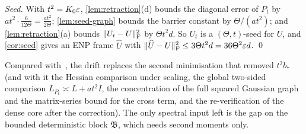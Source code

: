 \emph{Seed.} With $t^2=K_0\varepsilon$, \cref{lem:retraction}(d) bounds the diagonal
error of $P_t$ by $at^2\cdot\frac6{12\Theta}=\frac{at^2}{2\Theta}$;
\cref{lem:seed-graph} bounds the barrier constant by $\Theta/(at^2)$; and
\cref{lem:retraction}(a) bounds $\lVert U_t-U\rVert_{\mathrm F}^2$ by $\Theta t^2d$. So $U_t$ is a
$(\Theta,t)$-seed for $U$, and \cref{cor:seed} gives an ENP frame $\widehat U$
with $\lVert \widehat U-U\rVert_{\mathrm F}^2\le3\Theta t^2d=36\Theta^2\varepsilon d$.
\qed

\begin{remark}
Compared with~\cite{Orig}, the drift replaces the second minimisation that
removed $t^2b_*$ (and with it the Hessian comparison under scaling, the global
two-sided comparison $L_{P_t}\asymp L+at^2I$, the concentration of the full
squared Gaussian graph and the matrix-series bound for the cross term, and the
re-verification of the dense core after the correction). The only spectral input
left is the gap on the bounded deterministic block $\mathfrak B$, which needs
second moments only.
\end{remark}
